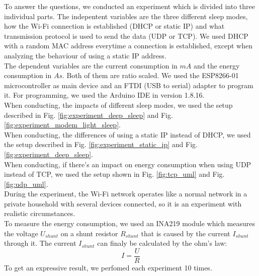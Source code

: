 To answer the questions, we conducted an experiment which is divided into three individual parts.
The indepentent variables are the three different sleep modes, how the Wi-Fi connection is established (DHCP or static IP) and what transmission protocol is used to send the data (UDP or TCP).
We used DHCP with a random MAC address everytime a connection is established, except when analyzing the behaviour of using a static IP address.\\
The dependent variables are the current consumption in $mA$ and the energy consumption in $As$. Both of them are ratio scaled.
We used the ESP8266-01 microcontroller as main device and an FTDI (USB to serial) adapter to program it. 
For programming, we used the Arduino IDE in version 1.8.16.\\
When conducting, the impacts of different sleep modes, we used the setup described in Fig. \ref{fig:experiment_deep_sleep} and Fig. \ref{fig:experiment_modem_light_sleep}.\\
When conducting, the differences of using a static IP instead of DHCP, we used the setup described in Fig. \ref{fig:experiment_static_ip} and Fig. \ref{fig:experiment_deep_sleep}.\\
When conducting, if there's an impact on energy consumption when using UDP instead of TCP, we used the setup shown in Fig. \ref{fig:tcp_uml} and Fig. \ref{fig:udp_uml}.\\
During the experiment, the Wi-Fi network operates like a normal network in a private household with several devices connected, so it is an experiment with realistic circumstances.\\

To measure the energy consumption, we used an INA219 module which measures the voltage $U_{shunt}$ on a shunt resistor $R_{shunt}$ that is caused by the current $I_{shunt}$ through it.
The current $I_{shunt}$ can finaly be calculated by the ohm's law:
\begin{equation*}
    I = \frac{U}{R}
\end{equation*}
To get an expressive result, we perfomed each experiment 10 times.





